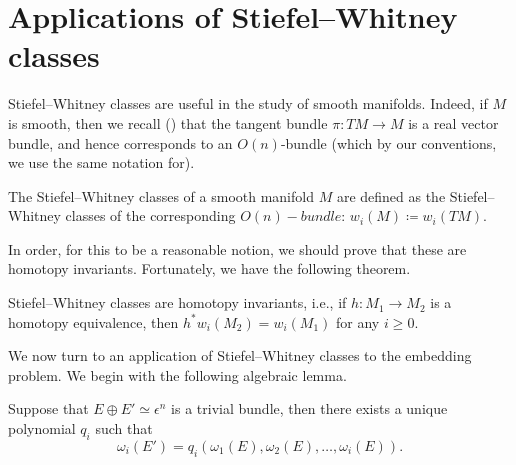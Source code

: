 \documentclass[ma3408.tex]{subfiles}
\begin{document}
\section{Applications of Stiefel--Whitney classes}
Stiefel--Whitney classes are useful in the study of smooth manifolds. Indeed, if $M$ is smooth, then we recall () that the tangent bundle $\pi \colon TM \to M$ is a real vector bundle, and hence corresponds to an $O(n)$-bundle (which by our conventions, we use the same notation for). 
\begin{Def}
The Stiefel--Whitney classes of a smooth manifold $M$ are defined as the Stiefel--Whitney classes of the corresponding $O(n)-bundle$: $w_i(M) \coloneqq w_i(TM)$. 
\end{Def}
\begin{Rem}
In order, for this to be a reasonable notion, we should prove that these are homotopy invariants. Fortunately, we have the following theorem.
\end{Rem}
\begin{Thm}[Wu] Stiefel--Whitney classes are homotopy invariants, i.e., if $h \colon M_1 \to M_2$ is a homotopy equivalence, then $h^*w_i(M_2) = w_i(M_1)$ for any $i \ge 0$. 
\end{Thm}
We now turn to an application of Stiefel--Whitney classes to the embedding problem. We begin with the following algebraic lemma.
\begin{Lem}\label{lem:inverting-classes}
Suppose that $E \oplus E' \simeq \epsilon^n$ is a trivial bundle, then there exists a unique polynomial $q_i$ such that 
\[
\omega_i(E') = q_i(\omega_1(E),\omega_2(E),\ldots,\omega_i(E)). 
\]
\end{Lem}
\end{document}
